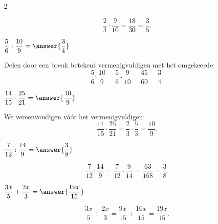 \documentclass{ximera}
\begin{document}
\begin{oefening}[Breuken]{\oefB\ESS}
\begin{multicols}{2}
\begin{question}
        \begin{oplossing}
        \[
        \dfrac23\cdot\dfrac9{10}
        =\dfrac{18}{30}
        =\dfrac35.
        \]
        \end{oplossing}
        \end{question}
        
        
        \begin{question}
        $\dfrac56:\dfrac{10}{9}=\answer{\dfrac34}$
        
        \begin{oplossing}
        Delen door een breuk betekent vermenigvuldigen met het omgekeerde:
        \[
        \dfrac56:\dfrac{10}{9}
        =\dfrac56\cdot\dfrac9{10}
        =\dfrac{45}{60}
        =\dfrac34.
        \]
        \end{oplossing}
        \end{question}
        
        
        \begin{question}
        $\dfrac{14}{15}\cdot\dfrac{25}{21}
        =\answer{\dfrac{10}{9}}$
        
        \begin{oplossing}
        We vereenvoudigen vóór het vermenigvuldigen:
        \[
        \dfrac{14}{15}\cdot\dfrac{25}{21}
        =\dfrac{2}{3}\cdot\dfrac{5}{3}
        =\dfrac{10}{9}.
        \]
        \end{oplossing}
        \end{question}
        
        
        \begin{question}
        $\dfrac{7}{12}:\dfrac{14}{9}
        =\answer{\dfrac38}$
        
        \begin{oplossing}
        \[
        \dfrac{7}{12}:\dfrac{14}{9}
        =\dfrac{7}{12}\cdot\dfrac9{14}
        =\dfrac{63}{168}
        =\dfrac38.
        \]
        \end{oplossing}
        \end{question}
        
        
        \begin{question}
        $\dfrac{3x}{5}+\dfrac{2x}{3}
        =\answer{\dfrac{19x}{15}}$
        
        \begin{oplossing}
        \[
        \dfrac{3x}{5}+\dfrac{2x}{3}
        =\dfrac{9x}{15}+\dfrac{10x}{15}
        =\dfrac{19x}{15}.
        \]
        \end{oplossing}
        \end{question}
        

\end{multicols}
\end{oefening}
\end{document}
